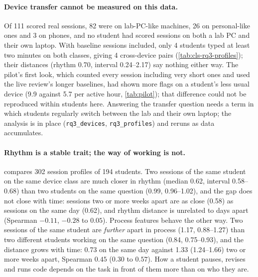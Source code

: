 \paragraph{Device transfer cannot be measured on this data.} Of 111 scored real sessions,
82 were on lab-PC-like machines, 26 on personal-like ones and 3 on phones, and no student had
scored sessions on both a lab PC and their own laptop. With baseline sessions included, only
4 students typed at least two minutes on both classes, giving 4 cross-device pairs
(\cref{tab:cls-rq3-profiles}); their distances (rhythm 0.70, interval 0.24--2.17) say nothing
either way. The pilot's first look, which counted every session including very short ones and
used the live review's longer baselines, had shown more flags on a student's less usual device
(9.9 against 5.7 per active hour, \cref{tab:pilot}); that difference could not be reproduced
within students here. Answering the transfer question needs a term in which students
regularly switch between the lab and their own laptop; the analysis is in place
(\texttt{rq3\_devices}, \texttt{rq3\_profiles}) and reruns as data accumulates.

\paragraph{Rhythm is a stable trait; the way of working is not.}
 compares 302 session profiles of 194 students. Two sessions of
the same student on the same device class are much closer in rhythm (median 0.62, interval
0.58--0.68) than two students on the same question (0.99, 0.96--1.02), and the gap does not
close with time: sessions two or more weeks apart are as close (0.58) as sessions on the same
day (0.62), and rhythm distance is unrelated to days apart (Spearman $-0.11$, $-0.28$ to
$0.05$). Process features behave the other way. Two sessions of the same student are
\emph{further} apart in process (1.17, 0.88--1.27) than two different students working on the
same question (0.84, 0.75--0.93), and the distance grows with time: 0.73 on the same day
against 1.33 (1.24--1.66) two or more weeks apart, Spearman $0.45$ ($0.30$ to $0.57$). How a
student pauses, revises and runs code depends on the task in front of them more than on who
they are.




